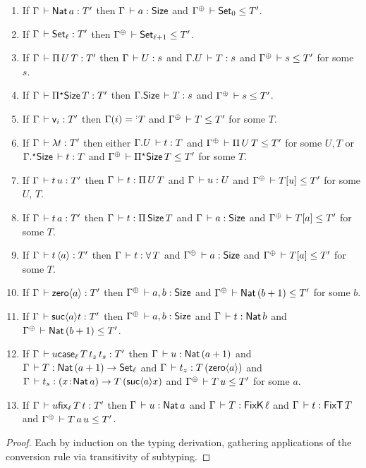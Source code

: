 \documentclass[acmlarge,review,anonymous]{acmart}\settopmatter{printfolios=true}
\begin{document}
\begin{lemma}
\label{lem:invty} \bla
\begin{enumerate}
\item If $\Gamma \der \Nat a : T'$ then $\Gamma \der a : \Size$ and $\resurrect\Gamma \der \Set[0] \leq T'$.
\item If $\Gamma \der \Set[\ell] : T'$ then $\resurrect\Gamma \der \Set[\ell+1] \leq T'$.
\item If $\Gamma \der \piT U T : T'$ then $\Gamma \der U : s$ and $\cext \Gamma U \der T : s$ and $\resurrect\Gamma \der s \leq T'$ for some $s$.
\item If $\Gamma \der \epiT \Size T : T'$ then $\cext\Gamma \Size \der T : s$ and $\resurrect\Gamma \der s \leq T'$.
\item If $\Gamma \der \ind i : T'$ then $\Gamma(i) = \erann[\noterased] T$ and $\resurrect\Gamma \der T \leq T'$ for some $T$.
\item If $\Gamma \der \lambda t : T'$ then either
  $\cext \Gamma U \der t : T$
  and
  $\resurrect\Gamma \der \piT U T \leq T'$
  for some $U,T$ or
  $\eext \Gamma \Size \der t : T$
  and
  $\resurrect\Gamma \der \epiT\Size T \leq T'$
  for some $T$.
\item If $\Gamma \der t\,u : T'$ then $\Gamma \der t : \piT U T$ and $\Gamma \der u : U$ and $\resurrect\Gamma \der T[u] \leq T'$ for some $U$, $T$.
\item If $\Gamma \der t\,a : T'$ then $\Gamma \der t : \piT \Size T$ and $\Gamma \der a : \Size$ and $\resurrect\Gamma \der T[a] \leq T'$ for some $T$.
\item If $\Gamma \der t\,\ann a : T'$ then $\Gamma \der t : \forallT T$ and $\resurrect\Gamma \der a : \Size$ and $\resurrect\Gamma \der T[a] \leq T'$ for some $T$.
\item If $\Gamma \der \zero a : T'$ then $\resurrect \Gamma \der a,b : \Size$ and $\resurrect\Gamma \der \Nat (b + 1) \leq T'$ for some $b$.
\item If $\Gamma \der \suc a t : T'$ then $\resurrect \Gamma \der a,b : \Size$ and $\Gamma \der t : \Nat b$ and $\resurrect\Gamma \der \Nat(b+1) \leq T'$.
\item If $\Gamma \der u \case[\ell] T {t_z} {t_s} : T'$ then $\Gamma \der u : \Nat (a+1)$ and $\Gamma \der T : \Nat(a+1) \to \Set[\ell]$ and $\Gamma \der t_z : T\,(\zero a)$ and $\Gamma \der t_s : \funT x {\Nat a} {T\,(\suc a x)}$ and $\resurrect\Gamma \der T\,u \leq T'$ for some $a$.
\item If $\Gamma \der u \fix[\ell] T t : T'$ then $\Gamma \der u : \Nat a$ and $\Gamma \der T : \FixK\,\ell$ and $\Gamma \der t : \FixT\,T$ and $\resurrect\Gamma \der T\,a\,u \leq T'$.
\end{enumerate}
\end{lemma}
\begin{proof}
  Each by induction on the typing derivation, gathering applications of the conversion rule via transitivity of subtyping.
\end{proof}
\end{document}
